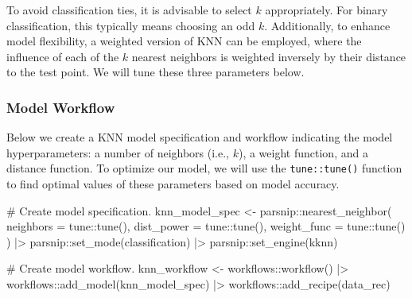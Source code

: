 \documentclass[
  letterpaper,
  DIV=11,
  numbers=noendperiod]{scrartcl}
\newenvironment{Shaded}{\begin{snugshade}}{\end{snugshade}}
\newcommand{\AttributeTok}[1]{\textcolor[rgb]{0.40,0.45,0.13}{#1}}
\newcommand{\CommentTok}[1]{\textcolor[rgb]{0.37,0.37,0.37}{#1}}
\newcommand{\FunctionTok}[1]{\textcolor[rgb]{0.28,0.35,0.67}{#1}}
\newcommand{\NormalTok}[1]{\textcolor[rgb]{0.00,0.23,0.31}{#1}}
\newcommand{\OtherTok}[1]{\textcolor[rgb]{0.00,0.23,0.31}{#1}}
\newcommand{\SpecialCharTok}[1]{\textcolor[rgb]{0.37,0.37,0.37}{#1}}
\newcommand{\StringTok}[1]{\textcolor[rgb]{0.13,0.47,0.30}{#1}}
\begin{document}
To avoid classification ties, it is advisable to select \(k\)
appropriately. For binary classification, this typically means choosing
an odd \(k\). Additionally, to enhance model flexibility, a weighted
version of KNN can be employed, where the influence of each of the \(k\)
nearest neighbors is weighted inversely by their distance to the test
point. We will tune these three parameters below.

\subsubsection{Model Workflow}\label{model-workflow}

Below we create a KNN model specification and workflow indicating the
model hyperparameters: a number of neighbors (i.e., \(k\)), a weight
function, and a distance function. To optimize our model, we will use
the \texttt{tune::tune()} function to find optimal values of these
parameters based on model accuracy.

\begin{Shaded}
\begin{Highlighting}[]
\CommentTok{\# Create model specification.}
\NormalTok{knn\_model\_spec }\OtherTok{\textless{}{-}}
\NormalTok{  parsnip}\SpecialCharTok{::}\FunctionTok{nearest\_neighbor}\NormalTok{(}
    \AttributeTok{neighbors =}\NormalTok{ tune}\SpecialCharTok{::}\FunctionTok{tune}\NormalTok{(),}
    \AttributeTok{dist\_power =}\NormalTok{ tune}\SpecialCharTok{::}\FunctionTok{tune}\NormalTok{(),}
    \AttributeTok{weight\_func =}\NormalTok{ tune}\SpecialCharTok{::}\FunctionTok{tune}\NormalTok{()}
\NormalTok{  ) }\SpecialCharTok{|\textgreater{}}
\NormalTok{  parsnip}\SpecialCharTok{::}\FunctionTok{set\_mode}\NormalTok{(}\StringTok{\textquotesingle{}classification\textquotesingle{}}\NormalTok{) }\SpecialCharTok{|\textgreater{}}
\NormalTok{  parsnip}\SpecialCharTok{::}\FunctionTok{set\_engine}\NormalTok{(}\StringTok{\textquotesingle{}kknn\textquotesingle{}}\NormalTok{)}

\CommentTok{\# Create model workflow.}
\NormalTok{knn\_workflow }\OtherTok{\textless{}{-}}\NormalTok{ workflows}\SpecialCharTok{::}\FunctionTok{workflow}\NormalTok{() }\SpecialCharTok{|\textgreater{}}
\NormalTok{  workflows}\SpecialCharTok{::}\FunctionTok{add\_model}\NormalTok{(knn\_model\_spec) }\SpecialCharTok{|\textgreater{}}
\NormalTok{  workflows}\SpecialCharTok{::}\FunctionTok{add\_recipe}\NormalTok{(data\_rec)}
\end{Highlighting}
\end{Shaded}
\end{document}
